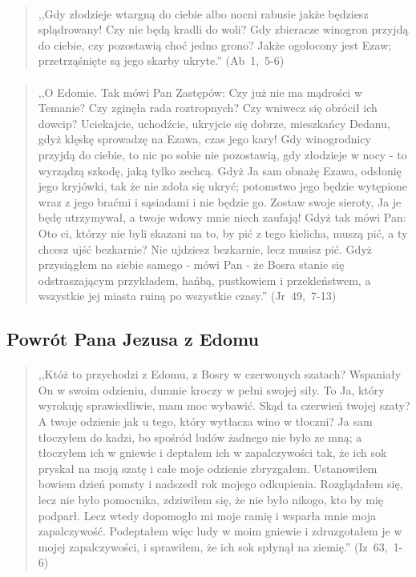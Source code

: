 \documentclass[10pt,a4paper,oneside]{article}
\begin{document}
\paragraph{}
\begin{quote}
,,Gdy złodzieje wtargną do ciebie albo nocni rabusie jakże będziesz splądrowany! Czy nie będą kradli do woli? Gdy zbieracze winogron przyjdą do ciebie, czy pozostawią choć jedno grono? Jakże ogołocony jest Ezaw; przetrząśnięte są jego skarby ukryte.'' \mbox{(Ab 1, 5-6)}
\end{quote}
\paragraph{}
\begin{quote}
,,O Edomie. Tak mówi Pan Zastępów: Czy już nie ma mądrości w Temanie? Czy zginęła rada roztropnych? Czy wniwecz się obrócił ich dowcip? Uciekajcie, uchodźcie, ukryjcie się dobrze, mieszkańcy Dedanu, gdyż klęskę sprowadzę na Ezawa, czas jego kary! Gdy winogrodnicy przyjdą do ciebie, to nic po sobie nie pozostawią, gdy złodzieje w nocy - to wyrządzą szkodę, jaką tylko zechcą. Gdyż Ja sam obnażę Ezawa, odsłonię jego kryjówki, tak że nie zdoła się ukryć; potomstwo jego będzie wytępione wraz z jego braćmi i sąsiadami i nie będzie go. Zostaw swoje sieroty, Ja je będę utrzymywał, a twoje wdowy mnie niech zaufają! Gdyż tak mówi Pan: Oto ci, którzy nie byli skazani na to, by pić z tego kielicha, muszą pić, a ty chcesz ujść bezkarnie? Nie ujdziesz bezkarnie, lecz musisz pić. Gdyż przysiągłem na siebie samego - mówi Pan - że Bosra stanie się odstraszającym przykładem, hańbą, pustkowiem i przekleństwem, a wszystkie jej miasta ruiną po wszystkie czasy.'' \mbox{(Jr 49, 7-13)}
\end{quote}
\subsection{Powrót Pana Jezusa z Edomu}
\paragraph{}
\begin{quote}
,,Któż to przychodzi z Edomu, z Bosry w czerwonych szatach? Wspaniały On w swoim odzieniu, dumnie kroczy w pełni swojej siły. To Ja, który wyrokuję sprawiedliwie, mam moc wybawić. Skąd ta czerwień twojej szaty? A twoje odzienie jak u tego, który wytłacza wino w tłoczni? Ja sam tłoczyłem do kadzi, bo spośród ludów żadnego nie było ze mną; a tłoczyłem ich w gniewie i deptałem ich w zapalczywości tak, że ich sok pryskał na moją szatę i całe moje odzienie zbryzgałem. Ustanowiłem bowiem dzień pomsty i nadszedł rok mojego odkupienia. Rozglądałem się, lecz nie było pomocnika, zdziwiłem się, że nie było nikogo, kto by mię podparł. Lecz wtedy dopomogło mi moje ramię i wsparła mnie moja zapalczywość. Podeptałem więc ludy w moim gniewie i zdruzgotałem je w mojej zapalczywości, i sprawiłem, że ich sok spłynął na ziemię.'' \mbox{(Iz 63, 1-6)}
\end{quote}
\end{document}
